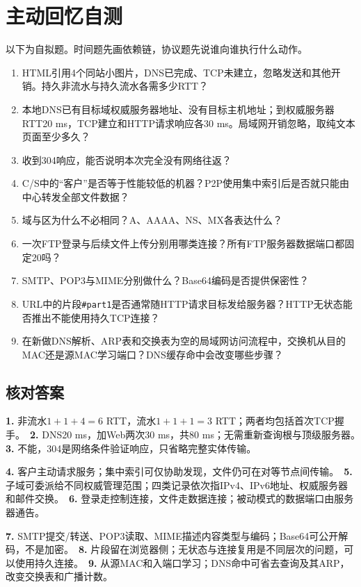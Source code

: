 \section{主动回忆自测}\label{CN06-review}

以下为自拟题。时间题先画依赖链，协议题先说谁向谁执行什么动作。

\begin{enumerate}
\def\labelenumi{\arabic{enumi}.}
\tightlist
\item
  HTML引用4个同站小图片，DNS已完成、TCP未建立，忽略发送和其他开销。持久非流水与持久流水各需多少RTT？
\item
  本地DNS已有目标域权威服务器地址、没有目标主机地址；到权威服务器RTT20 ms，TCP建立和HTTP请求响应各30 ms。局域网开销忽略，取纯文本页面至少多久？
\item
  收到304响应，能否说明本次完全没有网络往返？
\item
  C/S中的``客户''是否等于性能较低的机器？P2P使用集中索引后是否就只能由中心转发全部文件数据？
\item
  域与区为什么不必相同？A、AAAA、NS、MX各表达什么？
\item
  一次FTP登录与后续文件上传分别用哪类连接？所有FTP服务器数据端口都固定20吗？
\item
  SMTP、POP3与MIME分别做什么？Base64编码是否提供保密性？
\item
  URL中的片段\texttt{\#part1}是否通常随HTTP请求目标发给服务器？HTTP无状态能否推出不能使用持久TCP连接？
\item
  在新做DNS解析、ARP表和交换表为空的局域网访问流程中，交换机从目的MAC还是源MAC学习端口？DNS缓存命中会改变哪些步骤？
\end{enumerate}

\subsection{核对答案}\label{CN06-review-answers}

\textbf{1.} 非流水\(1+1+4=6\) RTT，流水\(1+1+1=3\) RTT；两者均包括首次TCP握手。　\textbf{2.} DNS20 ms，加Web两次30 ms，共80 ms；无需重新查询根与顶级服务器。　\textbf{3.} 不能，304是网络条件验证响应，只省略完整实体传输。

\textbf{4.} 客户主动请求服务；集中索引可仅协助发现，文件仍可在对等节点间传输。　\textbf{5.} 子域可委派给不同权威管理范围；四类记录依次指IPv4、IPv6地址、权威服务器和邮件交换。　\textbf{6.} 登录走控制连接，文件走数据连接；被动模式的数据端口由服务器通告。

\textbf{7.} SMTP提交/转送、POP3读取、MIME描述内容类型与编码；Base64可公开解码，不是加密。　\textbf{8.} 片段留在浏览器侧；无状态与连接复用是不同层次的问题，可以使用持久连接。　\textbf{9.} 从源MAC和入端口学习；DNS命中可省去查询及其ARP，改变交换表和广播计数。
